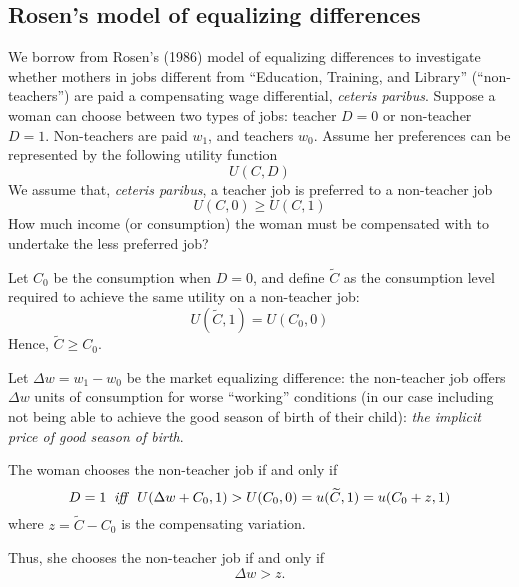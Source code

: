 \documentclass[a4paper, 11.5 pt]{article}
\theoremstyle{plain}
\begin{document}
\begin{doublespace}
\subsection{Rosen's model of equalizing differences}
We borrow from Rosen's (1986) model of equalizing differences to investigate whether mothers in jobs different from ``Education, Training, and Library'' (``non-teachers'') are paid a compensating wage differential, \emph{ceteris paribus}. Suppose a woman can choose between two types of jobs: teacher $D=0$ or non-teacher $D=1$. Non-teachers are paid $w_1$, and teachers $w_0$.
Assume her preferences can be represented by the following utility function
\begin{equation*}
U(C,D)
\end{equation*}
We assume that, \emph{ceteris paribus}, a teacher job is preferred to a non-teacher job
\begin{equation*}
U(C,0) \geq U(C,1)
\end{equation*}
How much income (or consumption) the woman must be compensated with to undertake the less preferred job?

Let $C_0$ be the consumption when $D=0$, and define $\widetilde{C}$ as the consumption level required to achieve the same utility on a non-teacher job:
\begin{equation*}
U(\widetilde{C},1) = U(C_0,0)
\end{equation*}
Hence, $\widetilde{C} \geq C_0$.

Let $\Delta w = w_1 - w_0$ be the market equalizing difference: the non-teacher job offers $\Delta w$ units of consumption for worse ``working'' conditions (in our case including not being able to achieve the good season of birth of their child): \emph{the implicit price of good season of birth}.

The woman chooses the non-teacher job if and only if
\begin{equation*}
D = 1\;\;\text{\emph{iff}}\;\;U(\Delta w + C_0,1)>U(C_0,0)=u(\widetilde{C},1)=u(C_0 + z, 1)
\end{equation*}
where $z = \widetilde{C} - C_0$ is the compensating variation.

Thus, she chooses the non-teacher job if and only if
\begin{equation*}
\Delta w > z.
\end{equation*}


\end{doublespace}
\end{document}
